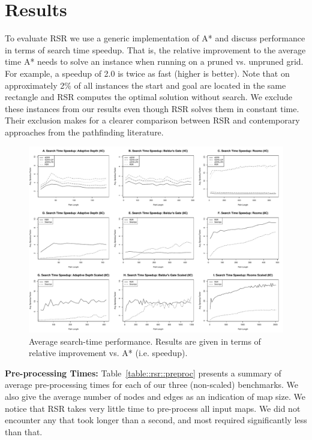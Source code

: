\section{Results}
\label{cha::rsr::results}
To evaluate RSR we use a generic implementation of A* and discuss performance 
in terms of search time speedup. That is, the relative improvement to the average 
time A* needs to solve an instance when running on a pruned  vs. unpruned grid.
For example, a speedup of 2.0 is twice as fast (higher is better).
Note that on approximately 2\% of all instances the start and goal are located
in the same rectangle and RSR computes the optimal solution without
search.  We exclude these instances from our results even though RSR solves
them in constant time. 
Their exclusion makes for a clearer comparison between
RSR and contemporary approaches from the pathfinding literature.

\begin{figure}
\begin{center}
   \includegraphics[width=0.85\columnwidth, trim = 0mm 0mm 0mm 0mm]{chapter_rsr/diagrams/speedup.pdf}
\end{center}
\caption[Search time speedup: RSR]
{\small 
Average search-time performance. 
Results are given in terms of relative improvement vs. A* (i.e. speedup).}
\label{fig::rsr::speedup}
\end{figure}


\textbf{Pre-processing Times: } 
Table~\ref{table::rsr::preproc} presents a summary of average pre-processing
times for each of our three (non-scaled) benchmarks. We also give the average
number of nodes and edges as an indication of map size.  We notice that RSR
takes very little time to pre-process all input maps.  We did not encounter
any that took longer than a second, and most required significantly less than
that.

